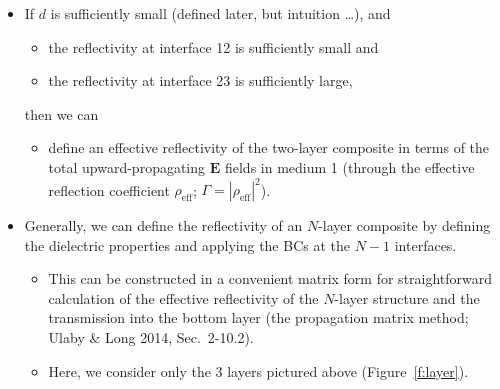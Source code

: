 \documentclass[11pt, oneside]{article}
\begin{document}
\begin{itemize}
	\item If $d$ is sufficiently small (defined later, but intuition \ldots), and
	\begin{itemize}
		\item the reflectivity at interface 12 is sufficiently small and
		\item the reflectivity at interface 23 is sufficiently large,
	\end{itemize}
	then we can
	\begin{itemize}
		\item[$\rightarrow$] define an effective reflectivity of the two-layer composite in terms of the total upward-\hspace{0pt}propagating $\mathbf{E}$ fields in medium 1 (through the effective reflection coefficient $\rho_\mathrm{eff}$; $\Gamma = |\rho_\mathrm{eff}|^2$).
	\end{itemize}
	\item Generally, we can define the reflectivity of an $N$-layer composite by defining the dielectric properties and applying the BCs at the $N-1$ interfaces.
	\begin{itemize}
		\item[$\rightarrow$] This can be constructed in a convenient matrix form for straightforward calculation of the effective reflectivity of the $N$-layer structure and the transmission into the bottom layer (the propagation matrix method; Ulaby \& Long 2014, Sec.~2-10.2).
		\item[$\rightarrow$] Here, we consider only the 3 layers pictured above (Figure~\ref{f:layer}).
	\end{itemize}
\end{itemize}
\end{document}
